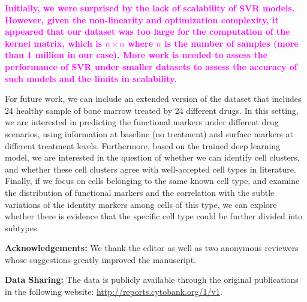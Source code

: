 \documentclass[graybox]{svmult}
\newcommand{\claudia}[2]{\sout{#1}\textcolor{magenta}{\textbf{#2}}}
\begin{document}
\claudia{}{Initially, we were surprised by the lack of scalability of
  SVR models. However, given the non-linearity and optimization
  complexity\cite{Smola2003, Welling2004}, it appeared that our
  dataset was too large for the computation of the kernel matrix,
  which is $n \times n$ where $n$ is the number of samples (more than
  1 million in our case). More work is needed to assess the
  performance of SVR under smaller datasets to assess the accuracy of
  such models and the limits in scalability.}

For future work, we can include an extended version of the
dataset\cite{Bendall2011,Qiu2011} that includes 24 healthy sample of
bone marrow treated by 24 different drugs. In this setting, we are
interested in predicting the functional markers under different drug
scenarios, using information at baseline (no treatment) and surface
markers at different treatment levels.
Furthermore, based on the trained deep learning model, we are
interested in the question of whether we can identify cell clusters,
and whether these cell clusters agree with well-accepted cell types in
literature.
Finally, if we focus on cells belonging to the same known cell type, and
examine the distribution of functional markers and the correlation
with the subtle variations of the identity markers among cells of this
type, we can explore whether there is evidence that the specific cell
type could be further divided into subtypes.


\vspace{0.5cm}
\noindent \textbf{Acknowledgements:} We thank the editor as well as
two anonymous reviewers whose suggestions greatly improved the
manuscript.

\vspace{0.5cm}
\noindent \textbf{Data Sharing:} The data is publicly available
through the original publications\cite{Bendall2011,Qiu2011} in the
following website: \url{http://reports.cytobank.org/1/v1}.







\end{document}
